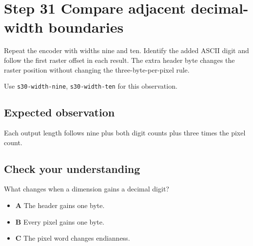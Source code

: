 \section{Step 31 Compare adjacent decimal-width boundaries}\label{ppm-s31}

Repeat the encoder with widths nine and ten. Identify the added ASCII digit and follow the first raster offset in each result. The extra header byte changes the raster position without changing the three-byte-per-pixel rule.

Use \texttt{s30-width-nine}, \texttt{s30-width-ten} for this observation.

\subsection{Expected observation}
Each output length follows nine plus both digit counts plus three times the pixel count.

\subsection{Check your understanding}
What changes when a dimension gains a decimal digit?

\begin{itemize}
\item \textbf{A} The header gains one byte.
\item \textbf{B} Every pixel gains one byte.
\item \textbf{C} The pixel word changes endianness.
\end{itemize}
